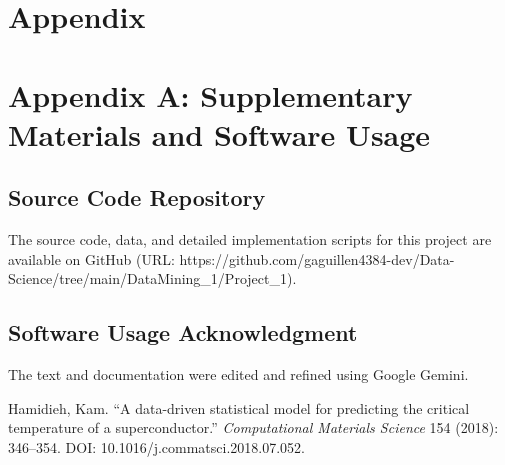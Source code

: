 \documentclass[conference]{IEEEtran}
\begin{document}
\section*{\textbf{Appendix}}
	
\section*{Appendix A: Supplementary Materials and Software Usage}
\subsection*{Source Code Repository \label{app:code}}
The source code, data, and detailed implementation scripts for this project are available on GitHub (URL: https://github.com/gaguillen4384-dev/Data-Science/tree/main/DataMining\_1/Project\_1).

\subsection*{Software Usage Acknowledgment}
The text and documentation were edited and refined using Google Gemini.

\begin{thebibliography}{9} %
	
	Hamidieh, Kam. ``A data-driven statistical model for predicting the critical temperature of a superconductor.'' \textit{Computational Materials Science} 154 (2018): 346--354. DOI: 10.1016/j.commatsci.2018.07.052.
	
\end{thebibliography}

\vspace{12pt}
\end{document}

